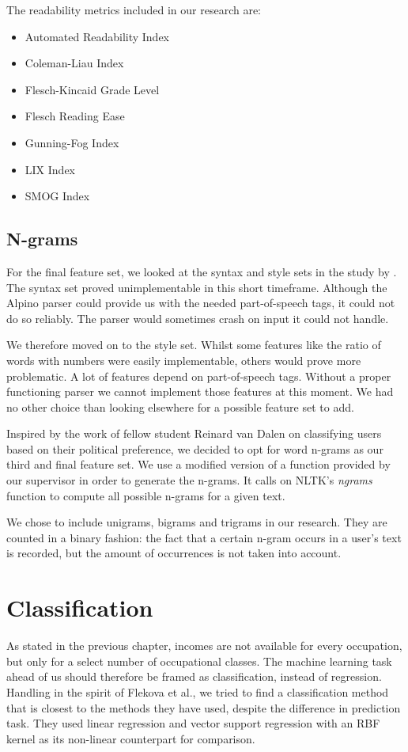 \documentclass[
10pt, %
a4paper, %
oneside, %
headinclude,footinclude, %
] {book}%
\begin{document}
The readability metrics included in our research are:
\begin{itemize}
\item Automated Readability Index
\item Coleman-Liau Index
\item Flesch-Kincaid Grade Level
\item Flesch Reading Ease
\item Gunning-Fog Index
\item LIX Index
\item SMOG Index
\end{itemize}

\subsection{N-grams}
For the final feature set, we looked at the syntax and style sets in the study by \citet{flekova}. 
The syntax set proved unimplementable in this short timeframe. Although the Alpino parser \citep{alpino} could provide us with the needed part-of-speech tags, it could not do so reliably. The parser would sometimes crash on input it could not handle.

We therefore moved on to the style set. Whilst some features like the ratio of words with numbers were easily implementable, others would prove more problematic. A lot of features depend on part-of-speech tags. Without a proper functioning parser we cannot implement those features at this moment. 
We had no other choice than looking elsewhere for a possible feature set to add.

Inspired by the work of fellow student Reinard van Dalen on classifying users based on their political preference, we decided to opt for word n-grams as our third and final feature set. We use a modified version of a function provided by our supervisor in order to generate the n-grams. It calls on NLTK's \textit{ngrams} function to compute all possible n-grams for a given text.

We chose to include unigrams, bigrams and trigrams in our research. They are counted in a binary fashion: the fact that a certain n-gram occurs in a user's text is recorded, but the amount of occurrences is not taken into account.

\section{Classification}
As stated in the previous chapter, incomes are not available for every occupation, but only for a select number of occupational classes. The machine learning task ahead of us should therefore be framed as classification, instead of regression.
Handling in the spirit of Flekova et al., we tried to find a classification method that is closest to the methods they have used, despite the difference in prediction task. They used linear regression and vector support regression with an RBF kernel as its non-linear counterpart for comparison. 
\end{document}
